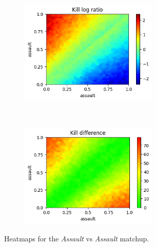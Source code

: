 \begin{figure}[H]
    \centering
    \begin{subfigure}[t]{0.5\textwidth}
        \centering
        \includegraphics[height=5cm]{Images/images/heatmaps/same-profile/assault_heatmap_ratio.png}
    \end{subfigure}%
    ~ 
    \begin{subfigure}[t]{0.5\textwidth}
        \centering
        \includegraphics[height=5cm]{Images/images/heatmaps/same-profile/assault_heatmap_diff.png}
    \end{subfigure}
    \caption{Heatmaps for the \textit{Assault} vs \textit{Assault} matchup.}
    \label{fig:balance_assault_assault}
\end{figure}

